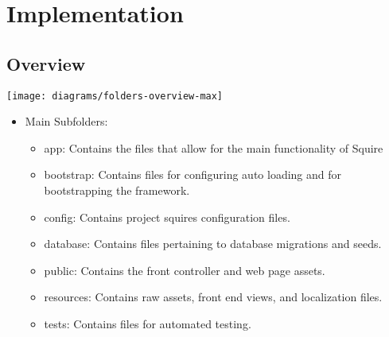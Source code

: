 
\chapter{Implementation}
    \section{Overview}
    \begin{minipage}{1\textwidth}
        \begin{center}
            \texttt{[image: diagrams/folders-overview-max]}
        \end{center}
    \end{minipage}
    
    \begin{itemize}
        \item Main Subfolders:
        \begin{itemize}
            \item app: Contains the files that allow for the main functionality of Squire
            \item bootstrap: Contains files for configuring auto loading and for bootstrapping the framework.
            \item config: Contains project squires configuration files.
            \item database: Contains files pertaining to database migrations and seeds.
            \item public: Contains the front controller and web page assets.
            \item resources: Contains raw assets, front end views, and localization files.
            \item tests: Contains files for automated testing.
        \end{itemize}
    \end{itemize}
    
